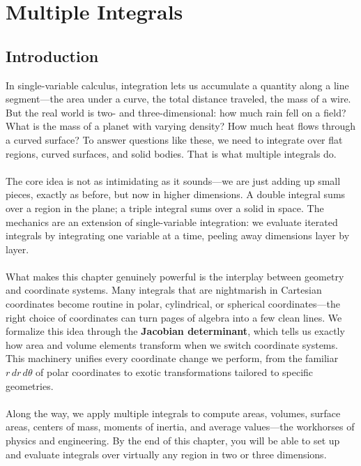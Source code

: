 
\chapter{Multiple Integrals}

\section*{Introduction}

In single-variable calculus, integration lets us accumulate a quantity along a line segment---the area under a curve, the total distance traveled, the mass of a wire. But the real world is two- and three-dimensional: how much rain fell on a field? What is the mass of a planet with varying density? How much heat flows through a curved surface? To answer questions like these, we need to integrate over flat regions, curved surfaces, and solid bodies. That is what multiple integrals do.\\ \\
\noindent The core idea is not as intimidating as it sounds---we are just adding up small pieces, exactly as before, but now in higher dimensions. A double integral sums over a region in the plane; a triple integral sums over a solid in space. The mechanics are an extension of single-variable integration: we evaluate iterated integrals by integrating one variable at a time, peeling away dimensions layer by layer.\\ \\
\noindent What makes this chapter genuinely powerful is the interplay between geometry and coordinate systems. Many integrals that are nightmarish in Cartesian coordinates become routine in polar, cylindrical, or spherical coordinates---the right choice of coordinates can turn pages of algebra into a few clean lines. We formalize this idea through the \textbf{Jacobian determinant}, which tells us exactly how area and volume elements transform when we switch coordinate systems. This machinery unifies every coordinate change we perform, from the familiar \( r\,dr\,d\theta \) of polar coordinates to exotic transformations tailored to specific geometries.\\ \\
\noindent Along the way, we apply multiple integrals to compute areas, volumes, surface areas, centers of mass, moments of inertia, and average values---the workhorses of physics and engineering. By the end of this chapter, you will be able to set up and evaluate integrals over virtually any region in two or three dimensions.


